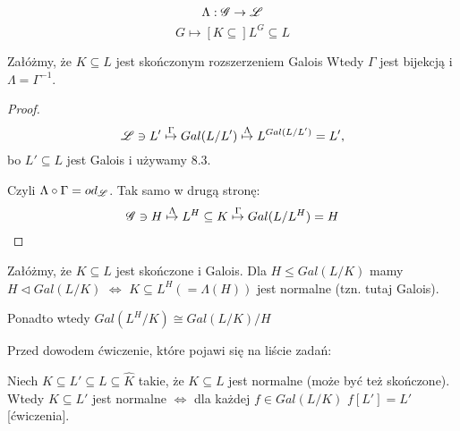 $$\Lambda:\mathcal{G}\to\mathcal{L}$$
$$G\mapsto [K\subseteq]L^{G}\subseteq L$$

\begin{theorem}
Załóżmy, że $K\subseteq L$ jest skończonym rozszerzeniem Galois Wtedy $\Gamma$ jest bijekcją i $\Lambda=\Gamma^{-1}$. 
\end{theorem}

\begin{proof}
$$\mathcal{L}\ni L'\overset{\Gamma}{\mapsto}Gal(L/L')\overset{\Lambda}{\mapsto}L^{Gal(L/L')}=L',$$
bo $L'\subseteq L$ jest Galois i używamy 8.3.

Czyli $\Lambda\circ\Gamma=od_{\mathcal{L}}$. Tak samo w drugą stronę:
$$\mathcal{G}\ni H\overset{\Lambda}{\mapsto}L^H\subseteq K\overset{\Gamma}{\mapsto}Gal(L/L^H)=H$$
\end{proof}

\setcounter{theorem}{8}

\begin{conclusion}
Załóżmy, że $K\subseteq L$ jest skończone i Galois. Dla $H\leq Gal(L/K)$ mamy $H\triangleleft Gal(L/K)$ $\iff$ $K\subseteq L^H(=\Lambda(H))$ jest normalne (tzn. tutaj Galois).

Ponadto wtedy $Gal(L^H/K)\cong Gal(L/K)/H$
\end{conclusion}

Przed dowodem ćwiczenie, które pojawi się na liście zadań:

Niech $K\subseteq L'\subseteq L\subseteq\hat{K}$ takie, że $K\subseteq L$ jest normalne (może być też skończone). Wtedy $K\subseteq L'$ jest normalne $\iff$ dla każdej $f\in Gal(L/K)$ $f[L']=L'$ [ćwiczenia].

